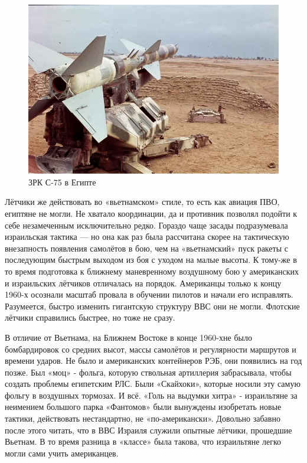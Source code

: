 \begin{figure}[h!tb] 
	\centering\includegraphics[scale=0.4]{Dolina_2/F8dlw3qe7jg.jpg}
	\caption{ЗРК С-75 в Египте}%
\end{figure}

Лётчики же действовать во «вьетнамском» стиле, то есть как авиация ПВО, египтяне не могли. Не хватало координации, да и противник позволял подойти к себе незамеченным исключительно редко. Гораздо чаще засады подразумевала израильская тактика — но она как раз была рассчитана скорее на тактическую внезапность появления самолётов в бою, чем на «вьетнамский» пуск ракеты с последующим быстрым выходом из боя с уходом на малые высоты. К тому-же в то время подготовка к ближнему маневренному воздушному бою у американских и израильских лётчиков отличалась на порядок. Американцы только к концу 1960-х осознали масштаб провала в обучении пилотов и начали его исправлять. Разумеется, быстро изменить гигантскую структуру ВВС они не могли. Флотские лётчики справились быстрее, но тоже не сразу.

В отличие от Вьетнама, на Ближнем Востоке в конце 1960-хне было бомбардировок со средних высот, массы самолётов и регулярности маршрутов и времени ударов. Не было и американских контейнеров РЭБ, они появились на год позже. Был «моц» - фольга, которую ствольная артиллерия забрасывала, чтобы создать проблемы египетским РЛС. Были «Скайхоки», которые носили эту самую фольгу в воздушных тормозах. И всё. «Голь на выдумки хитра» - израильтяне за неимением большого парка «Фантомов» были вынуждены изобретать новые тактики, действовать нестандартно, не «по-американски». Довольно забавно после этого читать, что в ВВС Израиля служили опытные лётчики, прошедшие Вьетнам. В то время разница в «классе» была такова, что израильтяне легко могли сами учить американцев.

